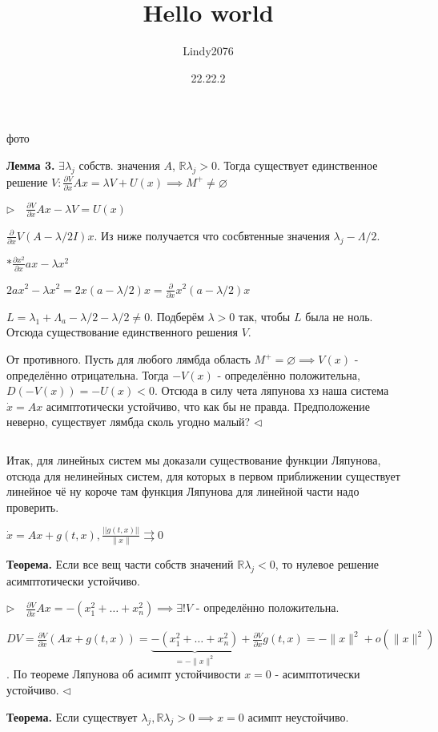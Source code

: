 \documentclass[12pt, a4paper]{article}
\title{Hello world}
\author{Lindy2076}
\date{22.22.2} %
\begin{document}
    фото

    \textbf{Лемма 3.} $\exists \lambda_j $ собств. значения $A$, $\mathbb{R}\lambda_j > 0$. Тогда существует единственное решение $V: \frac{\partial V}{\partial x} Ax = \lambda V + U(x) \implies M^+ \neq \varnothing$
    
    $\triangleright\quad \frac{\partial V}{\partial x}Ax - \lambda V = U(x)$

    $\frac{\partial}{\partial x} V (A - \lambda/2 I)x$. Из ниже получается что сосбвтенные значения $\lambda_j - \Lambda/2$.

    $* \frac{\partial x^2}{\partial x} ax - \lambda x^2$

    $2a x^2  - \lambda x^2 = 2x (a - \lambda/2)x = \frac{\partial}{\partial x} x^2 (a - \lambda/2)x$

    $L = \lambda_1 + \Lambda_a - \lambda/2 - \lambda/2 \neq 0$. Подберём $\lambda > 0$ так, чтобы $L$ была не ноль. Отсюда существование единственного решения $V$.
    
    От противного. Пусть для любого лямбда область $M^+ = \varnothing \implies V(x)$ - определённо отрицательна. Тогда $-V(x)$ - определённо положительна, $D(-V(x)) = -U(x) < 0$. Отсюда в силу чета ляпунова хз наша система $\dot x = Ax$ асимптотически устойчиво, что как бы не правда. Предположение неверно, существует лямбда сколь угодно малый? $\triangleleft$

    \par $ $

    Итак, для линейных систем мы доказали существование функции Ляпунова, отсюда для нелинейных систем, для которых в первом приближении существует линейное чё ну короче там функция Ляпунова для линейной части надо проверить.

    $\dot x = Ax + g(t,x), \frac{||g(t,x)||}{\|x\|} \rightrightarrows 0$

    \textbf{Теорема.} Если все вещ части собств значений $\mathbb{R}\lambda_j < 0$, то нулевое решение асимптотически устойчиво. 

    $\triangleright\quad \frac{\partial V}{\partial x}Ax = - (x^2_1 + \dotsc + x^2_n) \implies \exists ! V $ - определённо положительна.

    $DV = \frac{\partial V}{\partial x}(Ax + g(t,x)) = \underbrace{-(x_1^2 + \dotsc + x_n^2)}_{=-\|x\|^2} + \frac{\partial V}{\partial x}g(t,x) = - \|x\|^2 + o(\|x\|^2)$. По теореме Ляпунова об асимпт устойчивости $x=0$ - асимптотически устойчиво. $\triangleleft$

    \textbf{Теорема.} Если существует $\lambda_j, \mathbb{R}\lambda_j > 0 \implies x=0$ асимпт неустойчиво.
\end{document}
